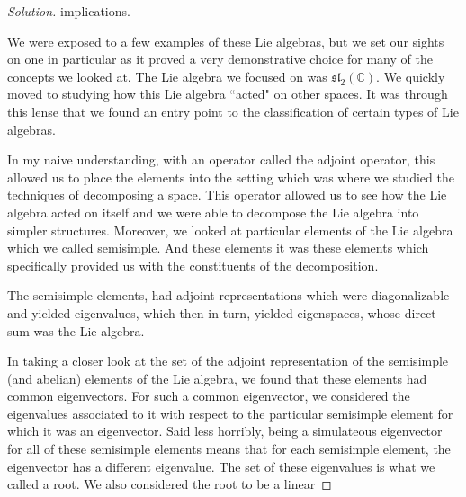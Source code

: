 \documentclass[12pt]{article}
\theoremstyle{definition}
\newenvironment{solution}
  {\renewcommand\qedsymbol{$\blacksquare$}\begin{proof}[Solution]}
  {\end{proof}}
\begin{document}
\begin{enumerate}
\begin{solution}
                implications.\par\hspace{4mm} We were exposed to a few examples
                of these Lie algebras, but we set our sights on one in
                particular as it proved a very demonstrative choice for many of
                the concepts we looked at. The Lie algebra we focused on was
                $\mathfrak{sl}_2(\mathbb{C})$. We quickly moved to studying how
                this Lie algebra ``acted" on other spaces. It was through this
                lense that we found an entry point to the classification of
                certain types of Lie algebras.\par\hspace{4mm} In my naive
                understanding, with an operator called the adjoint operator,
                this allowed us to place the elements into the setting which
                was where we studied the techniques of decomposing a space.
                This operator allowed us to see how the Lie algebra acted on
                itself and we were able to decompose the Lie algebra into
                simpler structures. Moreover, we looked at particular elements of the Lie
                algebra which we called semisimple. And these elements it was
                these elements which specifically provided us with the
                constituents of the decomposition. \par\hspace{4mm} The
                semisimple elements, had adjoint representations which were
                diagonalizable and yielded eigenvalues, which then in turn,
                yielded eigenspaces, whose direct sum was the Lie
                algebra.\par\hspace{4mm} In taking a closer look at the set of
                the adjoint representation of the
                semisimple (and abelian) elements of the Lie algebra, we found
                that these elements had common eigenvectors. For such
                a common eigenvector, we considered the eigenvalues associated
                to it with respect to the particular semisimple element for
                which it was an eigenvector. Said less horribly, being
                a simulateous eigenvector for all of these semisimple elements
                means that for each semisimple element, the eigenvector has
                a different eigenvalue. The set of these eigenvalues is what we
                called a root. We also considered the root to be a linear

\end{solution}
\end{enumerate}
\end{document}
